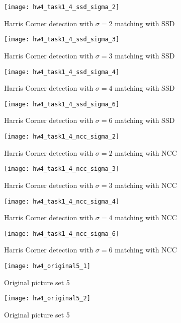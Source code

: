 \documentclass[11pt]{article}
\begin{document}
\begin{figure}[H]
\centering
\texttt{[image: hw4\_task1\_4\_ssd\_sigma\_2]}
\caption{Harris Corner detection with $\sigma = 2$ matching with SSD}
\label{}
\end{figure}
\begin{figure}[H]
\centering
\texttt{[image: hw4\_task1\_4\_ssd\_sigma\_3]}
\caption{Harris Corner detection with $\sigma = 3$ matching with SSD}
\label{}
\end{figure}
\begin{figure}[H]
\centering
\texttt{[image: hw4\_task1\_4\_ssd\_sigma\_4]}
\caption{Harris Corner detection with $\sigma = 4$ matching with SSD}
\label{}
\end{figure}
\begin{figure}[H]
\centering
\texttt{[image: hw4\_task1\_4\_ssd\_sigma\_6]}
\caption{Harris Corner detection with $\sigma = 6$ matching with SSD}
\label{}
\end{figure}

\begin{figure}[H]
\centering
\texttt{[image: hw4\_task1\_4\_ncc\_sigma\_2]}
\caption{Harris Corner detection with $\sigma = 2$ matching with NCC}
\label{}
\end{figure}
\begin{figure}[H]
\centering
\texttt{[image: hw4\_task1\_4\_ncc\_sigma\_3]}
\caption{Harris Corner detection with $\sigma = 3$ matching with NCC}
\label{}
\end{figure}
\begin{figure}[H]
\centering
\texttt{[image: hw4\_task1\_4\_ncc\_sigma\_4]}
\caption{Harris Corner detection with $\sigma = 4$ matching with NCC}
\label{}
\end{figure}
\begin{figure}[H]
\centering
\texttt{[image: hw4\_task1\_4\_ncc\_sigma\_6]}
\caption{Harris Corner detection with $\sigma = 6$ matching with NCC}
\label{}
\end{figure}


\begin{figure}[H]
\centering
\texttt{[image: hw4\_original5\_1]}
\caption{Original picture set 5}
\label{}
\end{figure}
\begin{figure}[H]
\centering
\texttt{[image: hw4\_original5\_2]}
\caption{Original picture set 5}
\label{}
\end{figure}
\end{document}
